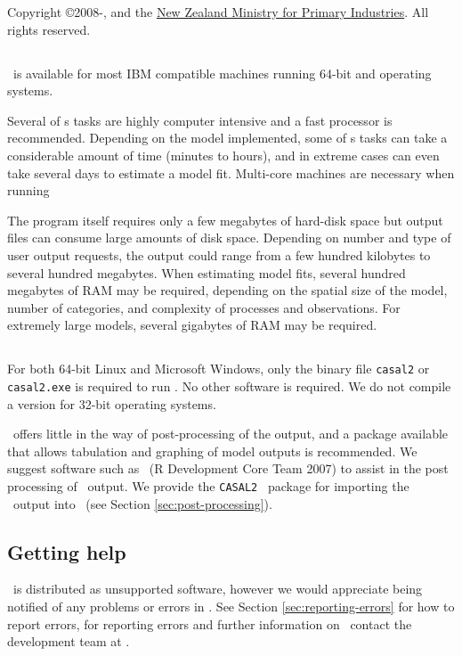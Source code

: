 Copyright \copyright 2008-\SourceControlYearDoc, \href{http://www.niwa.co.nz}{\Organisation} and the \href{http://www.mpi.govt.nz}{New Zealand Ministry for Primary Industries}. All rights reserved.

\subsection{}
\CNAME\ is available for most IBM compatible machines running 64-bit  and  operating systems.

Several of \CNAME s tasks are highly computer intensive and a fast processor is recommended. Depending on the model implemented, some of \CNAME s tasks can take a considerable amount of time (minutes to hours), and in extreme cases can even take several days to estimate a model fit. Multi-core machines are necessary when running \CNAME\

The program itself requires only a few megabytes of hard-disk space but output files can consume large amounts of disk space. Depending on number and type of user output requests, the output could range from a few hundred kilobytes to several hundred megabytes. When estimating model fits, several hundred megabytes of RAM may be required, depending on the spatial size of the model, number of categories, and complexity of processes and observations. For extremely large models, several gigabytes of RAM may be required. 

\subsection{}

For both 64-bit Linux and Microsoft Windows, only the binary file \texttt{casal2} or \texttt{casal2.exe} is required to run \CNAME . No other software is required. We do not compile a version for 32-bit operating systems. 

\CNAME\ offers little in the way of  post-processing of the output, and a package available that allows tabulation and graphing of model outputs is recommended. We suggest software such as \href{http://www.r-project.org}{\R}\ (R Development Core Team 2007) to assist in the post processing of \CNAME\ output. We provide the \texttt{CASAL2} \R\ package for importing the \CNAME\ output into \R\ (see Section \ref{sec:post-processing}).

\subsection{Getting help}
\CNAME\ is distributed as unsupported software, however we would appreciate being notified of any problems or errors in \CNAME. See Section \ref{sec:reporting-errors} for how to report errors, for reporting errors and further information on \CNAME\ contact the development team at \email.

